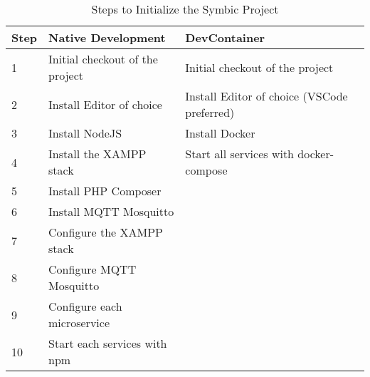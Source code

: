\begin{table}
  \centering
  \begin{tabular}{@{}lll@{}}
    \cellcolor[HTML]{FFFFFF}\textbf{Step} & \cellcolor[HTML]{FFFFFF}\textbf{Native Development}     & \cellcolor[HTML]{FFFFFF}\textbf{DevContainer}                           \\ \midrule\midrule
    \cellcolor[HTML]{DDDDDD}1  & \cellcolor[HTML]{12BA2E}Initial checkout of the project & \cellcolor[HTML]{12BA2E}Initial checkout of the project      \\
    \cellcolor[HTML]{DDDDDD}2  & \cellcolor[HTML]{DDDDDD}Install Editor of choice                   & \cellcolor[HTML]{DDDDDD}Install Editor of choice (\ac{VSCode} preferred)\\
    \cellcolor[HTML]{DDDDDD}3  & \cellcolor[HTML]{DDDDDD}Install NodeJS                             & \cellcolor[HTML]{DDDDDD}Install Docker                                  \\
    \cellcolor[HTML]{DDDDDD}4  & \cellcolor[HTML]{DDDDDD}Install the \ac{XAMPP} stack               & \cellcolor[HTML]{12BA2E}Start all services with docker-compose          \\
    \cellcolor[HTML]{DDDDDD}5  & \cellcolor[HTML]{DDDDDD}Install PHP Composer                       & \cellcolor[HTML]{DDDDDD}                                                \\
    \cellcolor[HTML]{DDDDDD}6  & \cellcolor[HTML]{DDDDDD}Install MQTT Mosquitto                     & \cellcolor[HTML]{DDDDDD}                                                \\
    \cellcolor[HTML]{DDDDDD}7  & \cellcolor[HTML]{DDDDDD}Configure the \ac{XAMPP} stack             & \cellcolor[HTML]{DDDDDD}                                                \\
    \cellcolor[HTML]{DDDDDD}8  & \cellcolor[HTML]{DDDDDD}Configure MQTT Mosquitto                   & \cellcolor[HTML]{DDDDDD}                                                \\
    \cellcolor[HTML]{DDDDDD}9  & \cellcolor[HTML]{DDDDDD}Configure each microservice                & \cellcolor[HTML]{DDDDDD}                                                \\
    \cellcolor[HTML]{DDDDDD}10 & \cellcolor[HTML]{12BA2E}Start each services with npm               & \cellcolor[HTML]{DDDDDD}                                                \\
  \end{tabular}
  \caption{Steps to Initialize the Symbic Project}\label{tab::init_steps}
\end{table}